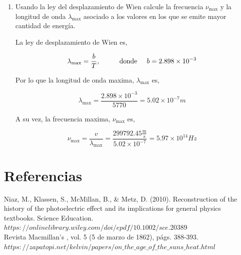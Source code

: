 \documentclass[12pt,a4paper]{article}
\begin{document}
\begin{enumerate}
\begin{enumerate}
$$
R = P / A 
$$

donde ahora $A$ es el área de la superficie del Sol, por lo que, 

$$
T = \left(\frac{4P}{Aac} \right)^\frac{1}{4}
$$

Ahora haciendo el calculo de $a$, se obtiene, 

$$
a = \frac{8\pi^5\left(1.38 \times 10^{-23} \, \frac{\mathrm{J}}{\mathrm{K}}\right)^4}{15\left(299792.45 \frac{\mathrm{m}}{\mathrm{s}}\right)^3(6.62 \times 10^{-34} \, \mathrm{J}\, \mathrm{s})^3} = 7.56 \times 10^{-16} \frac{\mathrm{J}}{\mathrm{K}^4 \mathrm{m}^3}
$$

Finalmente la temperatura del Sol es, 


$$
T = \left(\frac{4(3082.5 \times 10^{11} \, \mathrm{W})}{4\pi(7 \times 10^8 \, \mathrm{m})^2 (9.022 \times 10^{-7} \frac{\mathrm{J}}{\mathrm{K}^4 \mathrm{m}^3}) \left(299792.45 \frac{\mathrm{m}}{\mathrm{s}}\right) } \right)^\frac{1}{4} = 5770 K
$$


\item Usando la ley del desplazamiento de Wien calcule la frecuencia $\nu_{\mathrm{max}}$ y la longitud de onda $\lambda_{\mathrm{max}}$ asociado a los valores en los que se emite mayor cantidad de energía.

La ley de desplazamiento de Wien es, 

$$
\lambda_{\mathrm{max}} = \frac b T, \hspace{1cm} \mathrm{donde} \hspace{0.5cm} b = 2.898 \times 10^{-3}
$$

Por lo que la longitud de onda maxima,  $\lambda_{\mathrm{max}}$ es, 

$$
\lambda_{\mathrm{max}}  = \frac{2.898 \times 10^{-3}}{ 5770 } = 5.02  \times 10^{-7} m
$$

A su vez, la frecuencia maxima, $\nu_{\mathrm{max}}$ es, 

$$
\nu_{\mathrm{max}} = \frac{v}{\lambda_{\mathrm{max}}} = \frac{299792.45 \frac{\mathrm{m}}{\mathrm{s}}}{  5.02  \times 10^{-7} } = 5.97 \times 10^{14} Hz
$$


\end{enumerate}


\end{enumerate}


\section*{Referencias}

Niaz, M., Klassen, S., McMillan, B., \& Metz, D. (2010). Reconstruction of the history of the photoelectric effect and its implications for general physics textbooks. Science Education.\\
$https://onlinelibrary.wiley.com/doi/epdf/10.1002/sce.20389$
\\

Revista Macmillan's , vol. 5 (5 de marzo de 1862), págs. 388-393.\\
$https://zapatopi.net/kelvin/papers/on\_the\_age\_of\_the\_suns\_heat.html$
\end{document}
